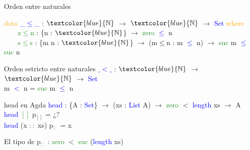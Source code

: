 \documentclass[xcolor=dvipsnames]{beamer} %
\newcommand{\cf}[1]{\textcolor{blue}{#1}}
\newcommand{\ct}[1]{\textcolor{blue}{#1}}
\newcommand{\cc}[1]{\textcolor{ForestGreen}{#1}}
\newcommand{\ck}[1]{\textcolor{orange}{#1}}
\newcommand{\N}{\ct{\mathbb{N}}}
\newcommand{\ra}{\rightarrow}
\begin{document}
\begin{frame}

\begin{block}{Orden entre naturales}

\ck{data} \ct{\_$\leq$\_} : $\N$ $\ra$ $\N$ $\ra$ \ct{Set} \ck{where}\\
\ \ \ \ \cc{z$\leq$n} : \{n : $\N$\}                 $\ra$ \cc{zero}  \ct{$\leq$} n\\
\ \ \ \ \cc{s$\leq$s} : \{m n : $\N$\} $\ra$ (m$\leq$n : m \ct{$\leq$} n) $\ra$ \cc{suc} m \ct{$\leq$} \cc{suc} n

\end{block}

\begin{block}{Orden estricto entre naturales}
\cf{$\_<\_$} : $\N$ $\ra$ $\N$ $\ra$ \ct{Set}\\
m \cf{$<$} n = \cc{suc} m \cf{$\leq$} n
\end{block}

\begin{block}{head en Agda}
    \cf{head} : \{A : \ct{Set}\}  $\ra$ (xs : \ct{List} A) $\ra$ 
    \cc{zero} $<$ \ct{length} xs $\rightarrow$ A \\
    \cf{head} \cc{$[]$} p$_{[]}$ = ¿?\\
    \cf{head} (x \cc{$::$} xs) p$_{::}$ = x
  \end{block}  

\begin{block}{}
El tipo de p$_{::}$ : \cc{zero} $<$ \cc{suc} (\cf{length} xs)
\end{block}

\end{frame}
\end{document}
